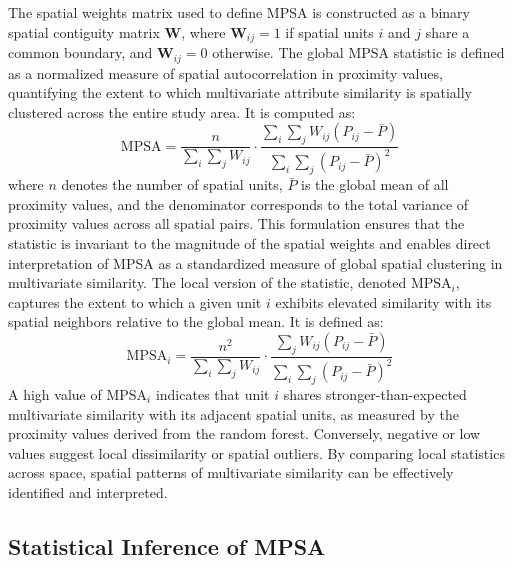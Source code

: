 \documentclass[
  a4paper,
  12pt]{article}
\begin{document}
The spatial weights matrix used to define MPSA is constructed as a
binary spatial contiguity matrix \(\mathbf{W}\), where
\(\mathbf{W}_{ij} = 1\) if spatial units \(i\) and \(j\) share a common
boundary, and \(\mathbf{W}_{ij} = 0\) otherwise. The global MPSA
statistic is defined as a normalized measure of spatial autocorrelation
in proximity values, quantifying the extent to which multivariate
attribute similarity is spatially clustered across the entire study
area. It is computed as: \begin{equation}
\label{eq:globalMPSA}
\text{MPSA} = \frac{n}{\sum_i\sum_j W_{ij}} \cdot \frac{\sum_i\sum_j W_{ij}(P_{ij} - \bar{P})}{\sum_i\sum_j (P_{ij} - \bar{P})^2}
\end{equation} where \(n\) denotes the number of spatial units,
\(\bar{P}\) is the global mean of all proximity values, and the
denominator corresponds to the total variance of proximity values across
all spatial pairs. This formulation ensures that the statistic is
invariant to the magnitude of the spatial weights and enables direct
interpretation of MPSA as a standardized measure of global spatial
clustering in multivariate similarity. The local version of the
statistic, denoted \(\text{MPSA}_i\), captures the extent to which a
given unit \(i\) exhibits elevated similarity with its spatial neighbors
relative to the global mean. It is defined as: \begin{equation}
\label{eq:localMPSA}
\text{MPSA}_i = \frac{n^2}{\sum_i\sum_j W_{ij}} \cdot \frac{\sum_j W_{ij}(P_{ij} - \bar{P})}{\sum_i\sum_j (P_{ij} - \bar{P})^2}
\end{equation} A high value of \(\text{MPSA}_i\) indicates that unit
\(i\) shares stronger-than-expected multivariate similarity with its
adjacent spatial units, as measured by the proximity values derived from
the random forest. Conversely, negative or low values suggest local
dissimilarity or spatial outliers. By comparing local statistics across
space, spatial patterns of multivariate similarity can be effectively
identified and interpreted.

\subsection{Statistical Inference of
MPSA}\label{statistical-inference-of-mpsa}
\end{document}

